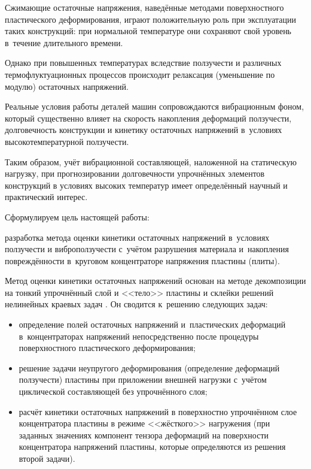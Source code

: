Сжимающие остаточные напряжения, наведённые методами поверхностного пластического деформирования, играют положительную роль при эксплуатации таких конструкций: при нормальной температуре они сохраняют свой уровень в~течение длительного времени.

Однако при повышенных температурах вследствие ползучести и различных термофлуктуационных процессов происходит релаксация  (уменьшение по модулю) остаточных напряжений. 



Реальные условия работы деталей машин сопровождаются вибрационным фоном, который существенно влияет на скорость накопления деформаций ползучести, долговечность конструкции и  кинетику остаточных напряжений в~условиях высокотемпературной ползучести. 

Таким образом, учёт вибрационной составляющей, наложенной на статическую нагрузку, при прогнозировании долговечности упрочнённых элементов конструкций  в условиях высоких температур имеет определённый научный и практический интерес.



Сформулируем цель настоящей работы:

разработка метода оценки кинетики остаточных напряжений в~условиях ползучести и виброползучести с~учётом разрушения материала и~накопления повреждённости в~круговом концентраторе напряжения пластины (плиты).



Метод оценки кинетики остаточных напряжений основан на методе декомпозиции на тонкий упрочнённый слой и <<тело>> пластины и склейки решений нелинейных краевых задач \cite{dubovova:3}. Он сводится  к~решению следующих задач:

\begin{itemize}

\item[1)] определение полей остаточных напряжений и~пластических деформаций в~концентраторах напряжений непосредственно после процедуры поверхностного пластического деформирования;



\item[2)] решение задачи неупругого деформирования (определение деформаций ползучести) пластины при приложении внешней нагрузки с~учётом циклической составляющей  без упрочнённого слоя;



\item[3)] расчёт кинетики остаточных напряжений в поверхностно упрочнённом  слое концентратора пластины в режиме <<жёсткого>> нагружения (при заданных значениях компонент тензора деформаций на поверхности концентратора напряжений пластины, которые определяются из решения второй задачи).





\end{itemize}





